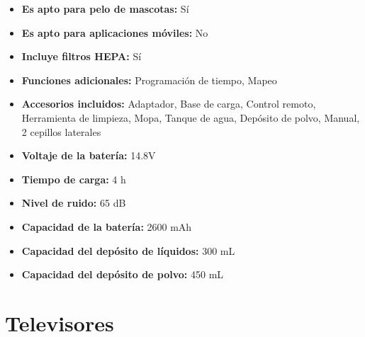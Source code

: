 \documentclass{article}
\begin{document}
\begin{adjustwidth}{2em}{}
\begin{itemize}
\begin{itemize}
    \item \textbf {Es apto para pelo de mascotas:} Sí
    \item \textbf {Es apto para aplicaciones móviles:} No
    \item \textbf {Incluye filtros HEPA:} Sí
    \item \textbf {Funciones adicionales:} Programación de tiempo, Mapeo
    \item \textbf {Accesorios incluidos:} Adaptador, Base de carga, Control remoto, Herramienta de limpieza, Mopa, Tanque de agua, Depósito de polvo, Manual, 2 cepillos laterales
    \item \textbf {Voltaje de la batería:} 14.8V
    \item \textbf {Tiempo de carga:} 4 h
    \item \textbf {Nivel de ruido:} 65 dB
    \item \textbf {Capacidad de la batería:} 2600 mAh
    \item \textbf {Capacidad del depósito de líquidos:} 300 mL
    \item \textbf {Capacidad del depósito de polvo:} 450 mL
    \end{itemize}
\end{itemize}

\vspace{1\baselineskip} %
\end{adjustwidth}


\section*{Televisores}
\setcounter{subsection}{0} %
\end{document}
